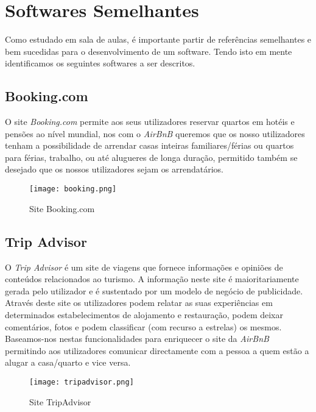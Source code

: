 \documentclass[a4paper]{article}
\begin{document}
\section{Softwares Semelhantes}
Como estudado em sala de aulas, é importante partir de referências semelhantes e bem sucedidas para o desenvolvimento de um software. Tendo isto em mente identificamos os seguintes softwares a ser descritos.
\subsection{Booking.com}
O site \textit{Booking.com} permite aos seus utilizadores reservar quartos em hotéis e pensões ao nível mundial, nos com o \textit{AirBnB} queremos que os nosso utilizadores tenham a possibilidade de arrendar casas inteiras familiares/férias ou quartos para férias, trabalho, ou até alugueres de longa duração, permitido também se desejado que os nossos utilizadores sejam os arrendatários. 

\begin{figure}[H]
    \centering
    \texttt{[image: booking.png]}    
    \caption{Site Booking.com\texttrademark}
\end{figure}

\newpage

\subsection{Trip Advisor}
O \textit{Trip Advisor} é um site de viagens que fornece informações e opiniões de conteúdos relacionados ao turismo. A informação neste site é maioritariamente gerada pelo utilizador e é sustentado por um modelo de negócio de publicidade.
Através deste site os utilizadores podem relatar as suas experiências em determinados estabelecimentos de alojamento e restauração, podem deixar comentários, fotos e podem classificar (com recurso a estrelas) os mesmos.
Baseamos-nos nestas funcionalidades para enriquecer o site da \textit{AirBnB} permitindo aos utilizadores comunicar directamente com a pessoa a quem estão a alugar a casa/quarto e vice versa. \cite{TripAdvisor}

\begin{figure}[H]
    \centering
    \texttt{[image: tripadvisor.png]}
    \caption{Site TripAdvisor\texttrademark}
    \label{fig:tripadv}
\end{figure}
\end{document}
